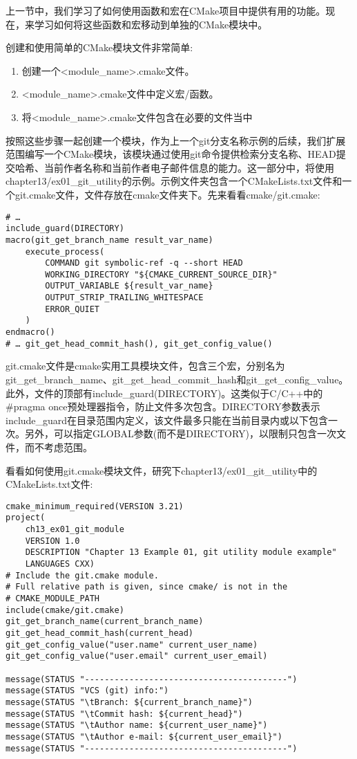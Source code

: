 
上一节中，我们学习了如何使用函数和宏在CMake项目中提供有用的功能。现在，来学习如何将这些函数和宏移动到单独的CMake模块中。

创建和使用简单的CMake模块文件非常简单:

\begin{enumerate}
\item 
创建一个<module\_name>.cmake文件。

\item 
<module\_name>.cmake文件中定义宏/函数。

\item 
将<module\_name>.cmake文件包含在必要的文件当中
\end{enumerate}

按照这些步骤一起创建一个模块，作为上一个git分支名称示例的后续，我们扩展范围编写一个CMake模块，该模块通过使用git命令提供检索分支名称、HEAD提交哈希、当前作者名称和当前作者电子邮件信息的能力。这一部分中，将使用chapter13/ex01\_git\_utility的示例。示例文件夹包含一个CMakeLists.txt文件和一个git.cmake文件，文件存放在cmake文件夹下。先来看看cmake/git.cmake:

\begin{lstlisting}[style=styleCMake]
# …
include_guard(DIRECTORY)
macro(git_get_branch_name result_var_name)
	execute_process(
		COMMAND git symbolic-ref -q --short HEAD
		WORKING_DIRECTORY "${CMAKE_CURRENT_SOURCE_DIR}"
		OUTPUT_VARIABLE ${result_var_name}
		OUTPUT_STRIP_TRAILING_WHITESPACE
		ERROR_QUIET
	)
endmacro()
# … git_get_head_commit_hash(), git_get_config_value()
\end{lstlisting}

git.cmake文件是cmake实用工具模块文件，包含三个宏，分别名为git\_get\_branch\_name、git\_get\_head\_commit\_hash和git\_get\_config\_value。此外，文件的顶部有include\_guard(DIRECTORY)。这类似于C/C++中的\#pragma once预处理器指令，防止文件多次包含。DIRECTORY参数表示include\_guard在目录范围内定义，该文件最多只能在当前目录内或以下包含一次。另外，可以指定GLOBAL参数(而不是DIRECTORY)，以限制只包含一次文件，而不考虑范围。

看看如何使用git.cmake模块文件，研究下chapter13/ex01\_git\_utility中的CMakeLists.txt文件:

\begin{lstlisting}[style=styleCMake]
cmake_minimum_required(VERSION 3.21)
project(
	ch13_ex01_git_module
	VERSION 1.0
	DESCRIPTION "Chapter 13 Example 01, git utility module example"
	LANGUAGES CXX)
# Include the git.cmake module.
# Full relative path is given, since cmake/ is not in the 
# CMAKE_MODULE_PATH
include(cmake/git.cmake)
git_get_branch_name(current_branch_name)
git_get_head_commit_hash(current_head)
git_get_config_value("user.name" current_user_name)
git_get_config_value("user.email" current_user_email)

message(STATUS "-----------------------------------------")
message(STATUS "VCS (git) info:")
message(STATUS "\tBranch: ${current_branch_name}")
message(STATUS "\tCommit hash: ${current_head}")
message(STATUS "\tAuthor name: ${current_user_name}")
message(STATUS "\tAuthor e-mail: ${current_user_email}")
message(STATUS "-----------------------------------------")
\end{lstlisting}

